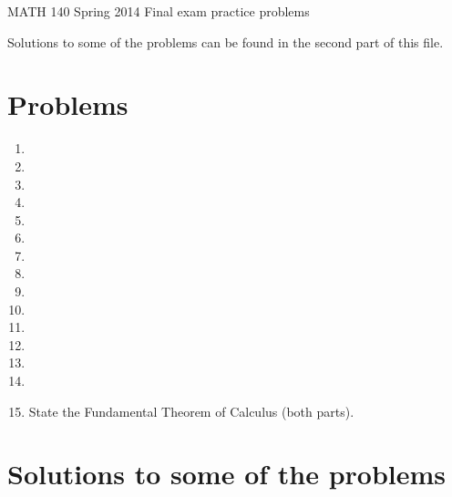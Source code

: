 \documentclass{article}[12pt]
\begin{document}
\begin{center}
MATH 140 Spring 2014 Final exam practice problems
\end{center}
Solutions to some of the problems can be found in the second part of this file.

\section{Problems}
\begin{enumerate}
\item

\item 
\item

\item 
\item 
\item 
\item 
\item 
\item

\item 
\item 
\item 
\item 
\item  
\item State the Fundamental Theorem of Calculus (both parts).
\end{enumerate}
\section{Solutions to some of the problems}
\end{document}
